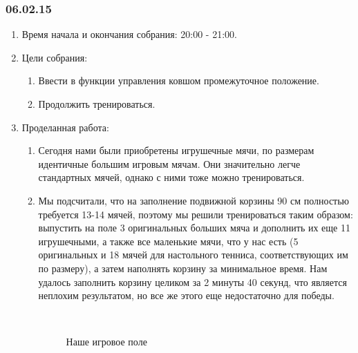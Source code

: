 \subsubsection{06.02.15}
\begin{enumerate}
	
	\item Время начала и окончания собрания: 20:00 - 21:00.
	
	\item Цели собрания: 
	\begin{enumerate}
		
		\item Ввести в функции управления ковшом промежуточное положение.
		
		\item Продолжить тренироваться.
		
	\end{enumerate}

	\item Проделанная работа:
	\begin{enumerate}
		
		\item Сегодня нами были приобретены игрушечные мячи, по размерам идентичные большим игровым мячам. Они значительно легче стандартных мячей, однако с ними тоже можно тренироваться.
		
		\item Мы подсчитали, что на заполнение подвижной корзины 90 см полностью требуется 13-14 мячей, поэтому мы решили тренироваться таким образом: выпустить на поле 3 оригинальных больших мяча и дополнить их еще 11 игрушечными, а также все маленькие мячи, что у нас есть (5 оригинальных и 18 мячей для настольного тенниса, соответствующих им по размеру), а затем наполнять корзину за минимальное время. Нам удалось заполнить корзину целиком за 2 минуты 40 секунд, что является неплохим результатом, но все же этого еще недостаточно для победы.
		\begin{figure}[H]
			\begin{minipage}[h]{0.2\linewidth}
				\center  
			\end{minipage}
			\begin{minipage}[h]{0.6\linewidth}
				\caption{Наше игровое поле}
			\end{minipage}
		\end{figure}
		

\end{enumerate}
\end{enumerate}
